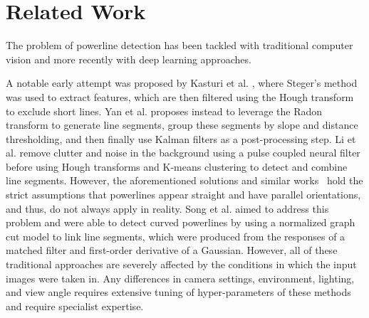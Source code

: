 \documentclass[journal]{IEEEtran}
\begin{document}



\section{Related Work}

The problem of powerline detection has been tackled with traditional computer vision and more recently with deep learning approaches. 

A notable early attempt was proposed by Kasturi et al. \cite{related_work_kasturi_2002}, where Steger's method \cite{related_work_steger_1998} was used to extract features, which are then filtered using the Hough transform to exclude short lines. Yan et al. \cite{related_work_guanjian_yan_2007} proposes instead to leverage the Radon transform to generate line segments, group these segments by slope and distance thresholding, and then finally use Kalman filters as a post-processing step. Li et al. \cite{related_work_li_zhenrong_2010} remove clutter and noise in the background using a pulse coupled neural filter before using Hough transforms and K-means clustering to detect and combine line segments. However, the aforementioned solutions and similar works~\cite{related_work_candamo_2009, related_work_golightly_2005, related_work_zhengrong_li_2008, related_work_boris_alpatov_2016} hold the strict assumptions that powerlines appear straight and have parallel orientations, and thus, do not always apply in reality. Song et al. \cite{related_work_biqin_song_2014} aimed to address this problem and were able to detect curved powerlines by using a normalized graph cut model to link line segments, which were produced from the responses of a matched filter and first-order derivative of a Gaussian. However, all of these traditional approaches are severely affected by the conditions in which the input images were taken in. Any differences in camera settings, environment, lighting, and view angle requires extensive tuning of hyper-parameters of these methods and require specialist expertise.
\end{document}
